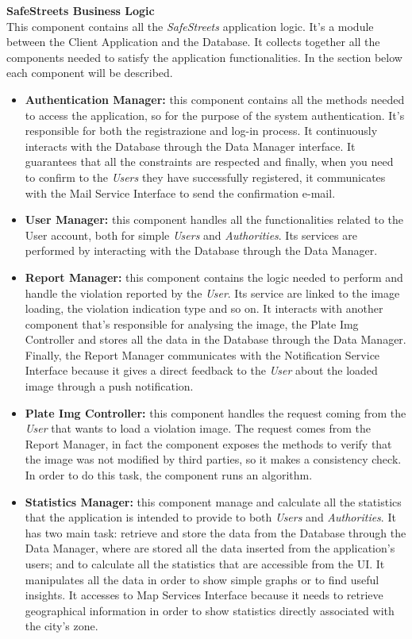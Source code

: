 \documentclass{article}
\begin{document}
		{\bf SafeStreets Business Logic} \\
		This component contains all the {\it SafeStreets} application logic. It's a module between the Client Application and the Database. It collects together all the components needed to satisfy the application functionalities. In the section below each component will be described.
		\begin{itemize}
		\item {\bf Authentication Manager:} this component contains all the methods needed to access the application, so for the purpose of the system authentication. It's responsible for both the registrazione and log-in process. It continuously interacts with the Database through the Data Manager interface. It guarantees that all the constraints are respected and finally, when you need to confirm to the {\it Users} they have successfully registered, it communicates with the Mail Service Interface to send the confirmation e-mail. 
		\item {\bf User Manager:} this component handles all the functionalities related to the User account, both for simple {\it Users} and {\it Authorities}. Its services are performed by interacting with the Database through the Data Manager. 
		\item {\bf Report Manager:} this component contains the logic needed to perform and handle the violation reported by the {\it User}. Its service are linked to the image loading, the violation indication type and so on. It interacts with another component that's responsible for analysing the image, the Plate Img Controller and stores all the data in the Database through the Data Manager.  Finally, the Report Manager communicates with the Notification Service Interface because it gives a direct feedback to the {\it User} about the loaded image through a push notification.
		\item {\bf Plate Img Controller:} this component handles the request coming from the {\it User} that wants to load a violation image. The request comes from the Report Manager, in fact the component exposes the methods to verify that the image was not modified by third parties, so it makes a consistency check. In order to do this task, the component runs an algorithm.
		\item {\bf Statistics Manager:} this component manage and calculate all the statistics that the application is intended to provide to both {\it Users} and {\it Authorities}. It has two main task: retrieve and store the data from the Database through the Data Manager, where are stored all the data inserted from the application's users; and to calculate all the statistics that are accessible from the UI. It manipulates all the data in order to show simple graphs or to find useful insights. It accesses to Map Services Interface because it needs to retrieve geographical information in order to show statistics directly associated with the city's zone.

\end{itemize}
\end{document}
